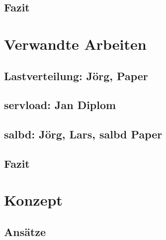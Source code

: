 \documentclass[a4paper, 11pt, toc=bibliography, toc=listof]{scrbook}
\begin{document}


		\section{Fazit} %
		\label{sec:Fazit}
		


	\chapter{Verwandte Arbeiten} %
	\label{cha:Verwandte Arbeiten}

		\section{Lastverteilung: Jörg, Paper} %
		\label{sec:Lastverteilung: Jörg, Paper}
		

		\section{servload: Jan Diplom} %
		\label{sec:servload: Jan Diplom}
		

		\section{salbd: Jörg, Lars, salbd Paper } %
		\label{sec:salbd: Jörg}
		

		\section{Fazit} %
		\label{sec:Fazit}
		


	\chapter{Konzept} %
	\label{cha:Konzept}

		\section{Ansätze} %
		\label{sec:Ansätze}
		
\end{document}
